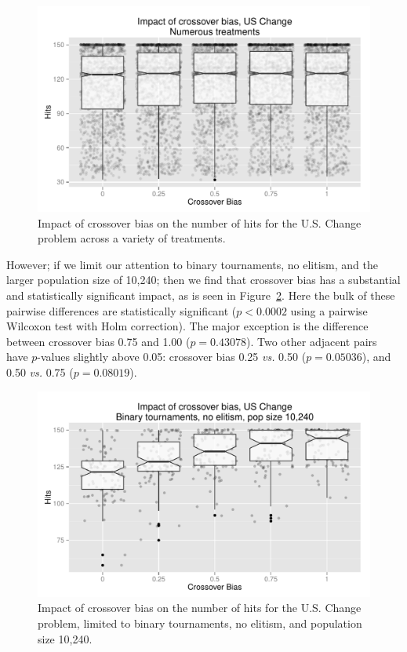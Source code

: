 \documentclass{sig-alternate}
\begin{document}
\begin{figure}
\centering
\includegraphics[width=0.45 \textwidth]{Plots/US_change_hits.pdf}
\caption{Impact of crossover bias on the number of hits for the U.S. Change problem across a variety of treatments.}
\label{fig:USChange_Hits}
\end{figure}

%
%
%
%

However; if we limit our attention to binary tournaments, no elitism, and the larger population size of 10,240; then we
find that crossover bias has a substantial and statistically significant impact, as is seen in
Figure~\ref{fig:USChange_Hits_strong}. Here the bulk of these pairwise differences are statistically significant
($p<0.0002$ using a pairwise Wilcoxon test with Holm correction). The major exception is the difference between
crossover bias 0.75 and 1.00 ($p=0.43078$). Two other adjacent pairs have $p$-values slightly above 0.05: crossover bias
0.25 \emph{vs.} 0.50 ($p=0.05036$), and 0.50 \emph{vs.} 0.75 ($p=0.08019$).

\begin{figure}
\centering
\includegraphics[width=0.45 \textwidth]{Plots/US_change_hits_strong.pdf}
\caption{Impact of crossover bias on the number of hits for the U.S. Change problem, limited to binary 
tournaments, no elitism, and population size 10,240.}
\label{fig:USChange_Hits_strong}
\end{figure}
\end{document}
